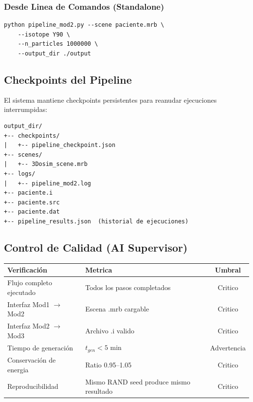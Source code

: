 \documentclass[12pt,a4paper]{article}
\begin{document}
\subsubsection{Desde Linea de Comandos (Standalone)}

\begin{lstlisting}
python pipeline_mod2.py --scene paciente.mrb \
    --isotope Y90 \
    --n_particles 1000000 \
    --output_dir ./output
\end{lstlisting}

\subsection{Checkpoints del Pipeline}

El sistema mantiene checkpoints persistentes para reanudar ejecuciones interrumpidas:

\begin{lstlisting}
output_dir/
+-- checkpoints/
|   +-- pipeline_checkpoint.json
+-- scenes/
|   +-- 3Dosim_scene.mrb
+-- logs/
|   +-- pipeline_mod2.log
+-- paciente.i
+-- paciente.src
+-- paciente.dat
+-- pipeline_results.json  (historial de ejecuciones)
\end{lstlisting}


\begin{tcolorbox}[aiSupervisor]

\begin{tcolorbox}[aiSupervisor]
\subsection*{Control de Calidad (AI Supervisor)}

\begin{table}[H]
\centering
\begin{tabular}{llc}
\toprule
\textbf{Verificación} & \textbf{Metrica} & \textbf{Umbral} \\
\midrule
Flujo completo ejecutado & Todos los pasos completados & Critico \\
Interfaz Mod1 $\to$ Mod2 & Escena .mrb cargable & Critico \\
Interfaz Mod2 $\to$ Mod3 & Archivo .i valido & Critico \\
Tiempo de generación & $t_{gen} < 5$ min & Advertencia \\
Conservación de energia & Ratio 0.95--1.05 & Critico \\
Reproducibilidad & Mismo RAND seed produce mismo resultado & Critico \\
\bottomrule
\end{tabular}
\end{table}


\newpage

\end{tcolorbox}
\end{tcolorbox}
\end{document}
